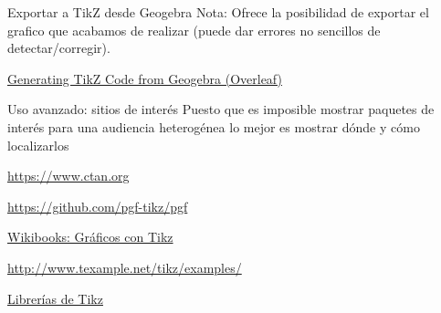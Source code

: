 \documentclass[10pt]{beamer}
\begin{document}
\begin{frame}[fragile]{Exportar a TikZ desde Geogebra}
Nota: Ofrece la posibilidad de exportar el grafico
que acabamos de realizar (puede dar errores no sencillos de detectar/corregir).

\href{https://www.overleaf.com/learn/latex/LaTeX_Graphics_using_TikZ%3A_A_Tutorial_for_Beginners_(Part_2)%E2%80%94Generating_TikZ_Code_from_GeoGebra}{\color{blue} Generating TikZ Code from Geogebra (Overleaf)}


\end{frame}





\begin{frame}[fragile]{Uso avanzado: sitios de interés}
Puesto que es imposible mostrar paquetes de interés para una 
audiencia heterogénea lo mejor es mostrar dónde y cómo localizarlos

\href{https://www.ctan.org}{\color{blue}https://www.ctan.org}

\href{https://github.com/pgf-tikz/pgf}{\color{blue}https://github.com/pgf-tikz/pgf}

\href{https://es.wikibooks.org/wiki/Manual_de_LaTeX/Inclusi%C3%B3n_de_gr%C3%A1ficos/Gr%C3%A1ficos_con_TikZ}{\color{blue}Wikibooks: Gráficos con Tikz}

\href{http://www.texample.net/tikz/examples/}{\color{blue}http://www.texample.net/tikz/examples/}

\href{https://tex.stackexchange.com/questions/42611/list-of-available-tikz-libraries-with-a-short-introduction}{\color{blue} Librerías de Tikz}

\end{frame}
\end{document}

